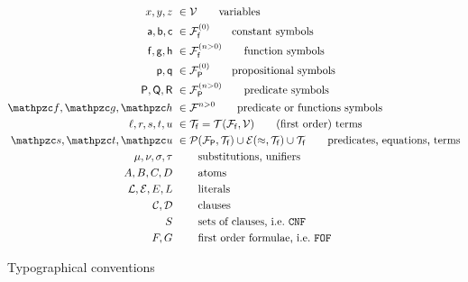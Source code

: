 \begin{figure}[hbt]
	\begin{align*}
	x,y,z &\ \in\mcV \tag*{variables} \\
	\ma,\mb,\mc &\ \in\mcFfn[{0}]\tag*{constant symbols} \\
	\mf, \mg, \mh &\ \in\mcFfn[{n>0}]\tag*{function symbols} \\
	\mpp, \mpq&\ \in\mcFPn[{0}]\tag*{propositional symbols}\\
	\mP, \mQ, \mR &\ \in\mcFPn[{n>0}]\tag*{predicate symbols}\\
	\mcf, \mcg, \mch &\ \in\mcF^{n>0} \tag*{predicate or functions symbols}\\
	\ell, r, s,t,u &\ \in\mcTf = \mcTFfV\tag*{(first order) terms}\\
	\mcs, \mct, \mcu &\ \in \mcPT \cup \mcET \cup \mcTf \tag*{predicates, equations, terms}\\
	\mu, \nu, \sigma, \tau &\ \tag*{substitutions, unifiers}\\
	A,B,C,D &\ \tag*{atoms} \\
	\mcL, \mcE, E, L &\ \tag*{literals} \\
	\mcC, \mcD &\ \tag*{clauses} \\
	S &\ \tag*{sets of clauses, i.e.~\CNF}\\
	F, G &\ \tag*{first order formulae, i.e.~\FOF}
	\end{align*}
	\caption{Typographical conventions}
	\label{fig:conventions}
\end{figure}












